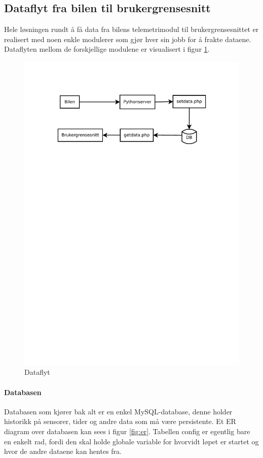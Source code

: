 \label{sec:losning}
\subsection{Dataflyt fra bilen til brukergrensesnitt}
Hele løsningen rundt å få data fra bilens telemetrimodul til brukergrensesnittet er realisert med noen enkle modulerer som gjør hver sin jobb for å frakte dataene. Dataflyten mellom de forskjellige modulene er visualisert i figur \ref{fig:dataflow}.

\begin{figure}[H]
\includegraphics[width=\textwidth, trim=0 540 0 75]{images/dataflow.pdf}
\caption{Dataflyt}
\label{fig:dataflow}
\end{figure}

\paragraph{Databasen}
Databasen som kjører bak alt er en enkel MySQL-database, denne holder historikk på sensorer, tider og andre data som må være persistente. Et ER diagram over databasen kan sees i figur \ref{fig:er}. Tabellen config er egentlig bare en enkelt rad, fordi den skal holde globale variable for hvorvidt løpet er startet og hvor de andre dataene kan hentes fra.

